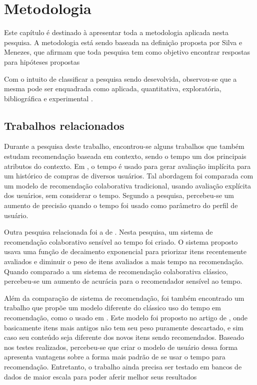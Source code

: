   \chapter[Metodologia]{Metodologia}

  Este capítulo é destinado à apresentar toda a metodologia aplicada nesta
  pesquisa. A metodologia está sendo baseada na definição proposta por Silva e Menezes, que afirmam que toda pesquisa
  tem como objetivo encontrar respostas para hipóteses propostas
  \cite{da2005metodologia}

  Com o intuito de classificar a pesquisa sendo desevolvida, observou-se que a
  mesma pode ser enquadrada como aplicada, quantitativa, exploratória, bibliográfica e
  experimental \cite{da2005metodologia}.


  \section{Trabalhos relacionados}

  Durante a pesquisa deste trabalho, encontrou-se alguns trabalhos que também estudam recomendação baseada em contexto, sendo o tempo um dos
  principais atributos do contexto. Em \cite{lee2008time}, o tempo é usado para gerar avaliação implícita para um histórico de
  compras de diversos usuários. Tal abordagem foi comparada com um modelo de recomendação colaborativa tradicional, usando avaliação explícita dos usuários,
  sem considerar o tempo. Segundo a pesquisa, percebeu-se um aumento de precisão
  quando o tempo foi usado como parâmetro do perfil de usuário.

  Outra pesquisa relacionada foi a de \cite{ding2005time}. Nesta pesquisa, um
  sistema de recomendação colaborativo sensível ao tempo foi criado. O sistema proposto usava uma função de
  decaimento exponencial para priorizar itens recentemente avaliados e diminuir o peso de itens avaliados a mais tempo na recomendação.
  Quando comparado a um sistema de
  recomendação colaborativa clássico, percebeu-se um aumento de acurácia para o recomendador sensível ao tempo.

  Além da comparação de sistema de recomendação, foi também encontrado um trabalho que propõe um modelo diferente do clássico uso do tempo em recomendação, como o usado em
  \cite{ding2005time}. Este modelo foi proposto no artigo de \cite{basile2015modeling}, onde basicamente itens mais antigos não tem seu peso puramente descartado, e sim caso
  seu conteúdo seja diferente dos novos itens sendo recomendados. Baseado nos
  testes realizados, percebeu-se que criar o modelo de usuário dessa forma apresenta vantagens sobre
  a forma mais padrão de se usar o tempo para recomendação. Entretanto, o trabalho ainda precisa ser testado em bancos de dados de maior escala para poder aferir melhor
  seus resultados

